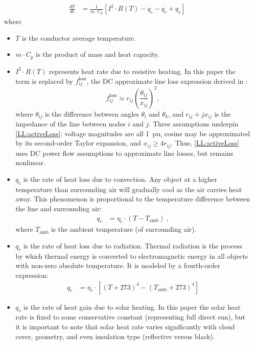 \documentclass[conference]{IEEEtran}
\begin{document}
\begin{align}\label{eq:heatbalance}
\frac{dT}{dt} &= \frac{1}{m\cdot C_p}\left[I^2\cdot R(T) - q_c - q_r + q_s \right]
\end{align}
where
\begin{itemize}
	\item $T$ is the conductor average temperature.
	\item $m\cdot C_p$ is the product of mass and heat capacity.
	\item $I^2\cdot R(T)$ represents heat rate due to resistive heating. In this paper the term is replaced by $f_{ij}^\text{loss}$, the DC approximate line loss expression derived in \cite{almassalkhi2014}:
	\begin{equation}
	\label{LL:activeLoss}
	f_{ij}^{\text{loss}} \approx r_{ij}\left(\frac{\theta_{ij}}{x_{ij}}\right)^2,
	\end{equation}
	where $\theta_{ij}$ is the difference between angles
	$\theta_i$ and $\theta_k$, and $r_{ij} +j x_{ij}$ is the impedance of
	the line between nodes $i$ and $j$. Three assumptions underpin
	\eqref{LL:activeLoss}: voltage magnitudes are all 1~pu, cosine may be
	approximated by its second-order Taylor expansion, and $x_{ij} \geq
	4r_{ij}$. Thus, \eqref{LL:activeLoss} uses DC power flow assumptions
	to approximate line losses, but remains nonlinear.
	\item $q_c$ is the rate of heat loss due to convection. Any object at a higher temperature than surrounding air will gradually cool as the air carries heat away. This phenomenon is proportional to the temperature difference between the line and surrounding air:
		\begin{align}\label{eq:qc}
		q_c &= \eta_c\cdot(T - T_\text{amb})~,
		\end{align}
	where $T_\text{amb}$ is the ambient temperature (of surrounding air).
	\item $q_r$ is the rate of heat loss due to radiation. Thermal radiation is the process by which thermal energy is converted to electromagnetic energy in all objects with non-zero absolute temperature. It is modeled by a fourth-order expression:
	  \begin{align}\label{eq:qr}
	    q_r &= \eta_r\cdot\left[(T + 273)^4 - (T_\text{amb} + 273)^4\right]
	  \end{align}
	\item $q_s$ is the rate of heat gain due to solar heating. In this paper the solar heat rate is fixed to some conservative constant (representing full direct sun), but it is important to note that solar heat rate varies significantly with cloud cover, geometry, and even insulation type (reflective versus black).
\end{itemize}
\end{document}
